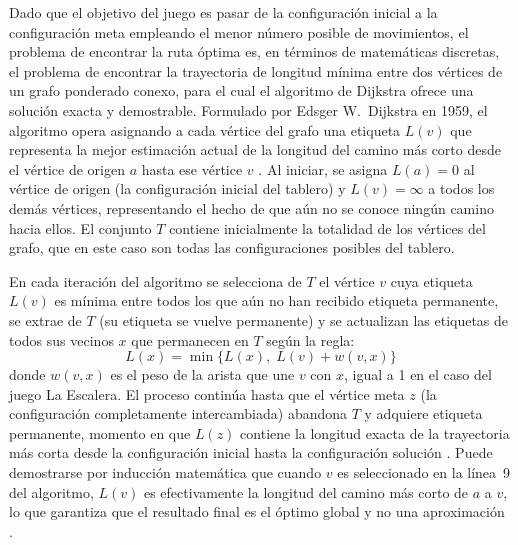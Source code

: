 \documentclass{book}
\begin{document}
Dado que el objetivo del juego es pasar de la configuración inicial a la
configuración meta empleando el menor número posible de movimientos, el
problema de encontrar la ruta óptima es, en términos de matemáticas
discretas, el problema de encontrar la trayectoria de longitud mínima
entre dos vértices de un grafo ponderado conexo, para el cual el
algoritmo de Dijkstra ofrece una solución exacta y demostrable.
Formulado por Edsger W.~Dijkstra en 1959, el algoritmo opera asignando a
cada vértice del grafo una etiqueta $L(v)$ que representa la mejor
estimación actual de la longitud del camino más corto desde el vértice de
origen $a$ hasta ese vértice $v$ \citep{Johnsonbaugh2005}. Al iniciar, se
asigna $L(a) = 0$ al vértice de origen (la configuración inicial del
tablero) y $L(v) = \infty$ a todos los demás vértices, representando el
hecho de que aún no se conoce ningún camino hacia ellos. El conjunto $T$
contiene inicialmente la totalidad de los vértices del grafo, que en este
caso son todas las configuraciones posibles del tablero.
 
En cada iteración del algoritmo se selecciona de $T$ el vértice $v$ cuya
etiqueta $L(v)$ es mínima entre todos los que aún no han recibido
etiqueta permanente, se extrae de $T$ (su etiqueta se vuelve permanente)
y se actualizan las etiquetas de todos sus vecinos $x$ que permanecen en
$T$ según la regla:
\begin{equation}
    L(x) = \min \bigl\{L(x),\; L(v) + w(v,x)\bigr\}
\end{equation}
donde $w(v,x)$ es el peso de la arista que une $v$ con $x$, igual a 1 en
el caso del juego La Escalera. El proceso continúa hasta que el vértice
meta $z$ (la configuración completamente intercambiada) abandona $T$ y
adquiere etiqueta permanente, momento en que $L(z)$ contiene la longitud
exacta de la trayectoria más corta desde la configuración inicial hasta
la configuración solución \citep{Johnsonbaugh2005}. Puede demostrarse por
inducción matemática que cuando $v$ es seleccionado en la línea~9 del
algoritmo, $L(v)$ es efectivamente la longitud del camino más corto de
$a$ a $v$, lo que garantiza que el resultado final es el óptimo global y
no una aproximación \citep{Johnsonbaugh2005}.
 
\end{document}
